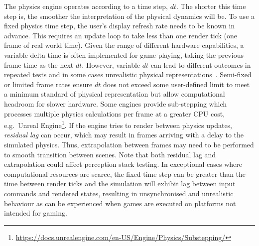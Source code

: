 \documentclass[letterpaper, 10 pt, journal, twoside]{IEEEtran}
\begin{document}
The physics engine operates according to a time step, $dt$. %
The shorter this time step is, the smoother the interpretation of the physical dynamics will be. %
%
%
To use a fixed physics time step, the user's display refresh rate needs to be known in advance. This requires an update loop to take less than one render tick (one frame of real world time). Given the range of different hardware capabilities, a variable delta time is often implemented for game playing, taking the previous frame time as the next $dt$. However, variable $dt$ can lead to different outcomes in repeated tests and in some cases unrealistic physical representations~\cite{gaffer}. 
%
Semi-fixed or limited frame rates ensure $dt$ does not exceed some user-defined limit to meet a minimum standard of physical representation but allow computational headroom for slower hardware. Some engines provide sub-stepping which processes multiple physics calculations per frame at a greater CPU cost, e.g.\ Unreal Engine\footnote{\url{https://docs.unrealengine.com/en-US/Engine/Physics/Substepping/}}. 
%
If the engine tries to render between physics updates, \textit{residual lag} can occur, which may result in frames arriving with a delay to the simulated physics.
%
Thus, extrapolation between frames may need to be performed to smooth transition between scenes. 
%
Note that both residual lag and extrapolation could affect perception stack testing.
%
%
In exceptional cases where computational resources are scarce, the fixed time step can be greater than the time between render ticks %
and the simulation will exhibit lag between input commands and rendered states, resulting in unsynchronised and unrealistic behaviour as can be experienced when games are executed on platforms not intended for gaming. 
\end{document}
